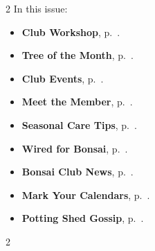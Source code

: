 \setlength{\columnsep}{-5.0cm}
\begin{multicols}{2}
    \noindent\textsf{In this issue:}
    \begin{itemize}
        \item \textsf{\textbf{Club Workshop}}, p.~\pageref{2025-03-workshop}.
        \item \textsf{\textbf{Tree of the Month}}, p.~\pageref{2025-03-contest}.
        \item \textsf{\textbf{Club Events}}, p.~\pageref{2025-03-calendar}.
        \item \textsf{\textbf{Meet the Member}}, p.~\pageref{2025-03-roots}.
        \item \textsf{\textbf{Seasonal Care Tips}}, p.~\pageref{2025-03-care}.
        \item \textsf{\textbf{Wired for Bonsai}}, p.~\pageref{2025-03-wired}.
        \item \textsf{\textbf{Bonsai Club News}}, p.~\pageref{2025-03-news}.
        \item \textsf{\textbf{Mark Your Calendars}}, p.~\pageref{2025-03-events}.
        \item \textsf{\textbf{Potting Shed Gossip}}, p.~\pageref{2025-03-gossip}.
    \end{itemize}
    \vfill\null
    \columnbreak

    
\end{multicols}
\pagebreak

\setlength{\columnsep}{0.5cm}
\begin{multicols}{2}
    
    
    
    
    
    
    
    
    
\end{multicols}
